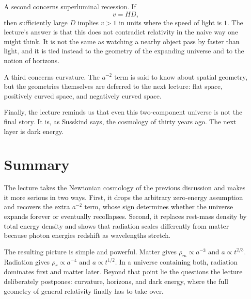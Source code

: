 A second concerns superluminal recession. If
\begin{equation}
v=HD,
\end{equation}
then sufficiently large \(D\) implies \(v>1\) in units where the speed of light is \(1\). The lecture's answer is that this does not contradict relativity in the naive way one might think. It is not the same as watching a nearby object pass by faster than light, and it is tied instead to the geometry of the expanding universe and to the notion of horizons.

A third concerns curvature. The \(a^{-2}\) term is said to know about spatial geometry, but the geometries themselves are deferred to the next lecture: flat space, positively curved space, and negatively curved space.

Finally, the lecture reminds us that even this two-component universe is not the final story. It is, as Susskind says, the cosmology of thirty years ago. The next layer is dark energy.

\section{Summary}

The lecture takes the Newtonian cosmology of the previous discussion and makes it more serious in two ways. First, it drops the arbitrary zero-energy assumption and recovers the extra \(a^{-2}\) term, whose sign determines whether the universe expands forever or eventually recollapses. Second, it replaces rest-mass density by total energy density and shows that radiation scales differently from matter because photon energies redshift as wavelengths stretch.

The resulting picture is simple and powerful. Matter gives \(\rho_m\propto a^{-3}\) and \(a\propto t^{2/3}\). Radiation gives \(\rho_r\propto a^{-4}\) and \(a\propto t^{1/2}\). In a universe containing both, radiation dominates first and matter later. Beyond that point lie the questions the lecture deliberately postpones: curvature, horizons, and dark energy, where the full geometry of general relativity finally has to take over.